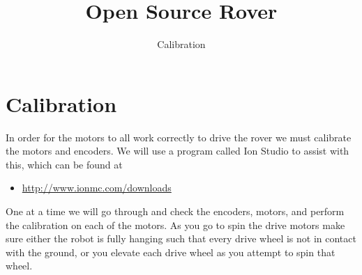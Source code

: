 \documentclass[12pt]{article}
\begin{document}
\title{Open Source Rover}
\author{Calibration}

\makeatletter         
\def\@maketitle{
\begin{center}	
	\makebox[\textwidth][c]{ \texttt{[image: "Pictures/calibration".png]}}
	{\Huge \bfseries \sffamily \@title }\\[4ex] 
	{\huge \bfseries \sffamily \@author}\\[4ex] 
	\texttt{[image: "Pictures/JPL logo".png]}
\end{center}}
\makeatother

\maketitle

\newpage


\tableofcontents




\section{Calibration}
\label{cal section}
In order for the motors to all work correctly to drive the rover we must calibrate the motors and encoders. We will use a program called Ion Studio to assist with this, which can be found at 
\begin{itemize}
	\item \href{http://www.ionmc.com/downloads}{http://www.ionmc.com/downloads} 
\end{itemize}

\noindent One at a time we will go through and check the encoders, motors, and perform the calibration on each of the motors. As you go to spin the drive motors make sure either the robot is fully hanging such that every drive wheel is not in contact with the ground, or you elevate each drive wheel as you attempt to spin that wheel. 
\end{document}
